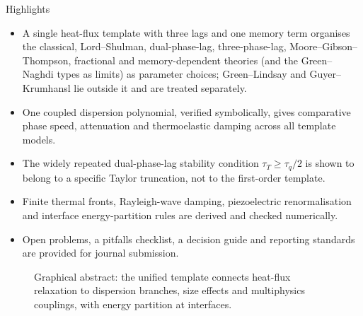 \begin{summarybox}{Highlights}
\begin{itemize}[nosep]
\item A single heat-flux template with three lags and one memory term organises the classical, Lord--Shulman, dual-phase-lag, three-phase-lag, Moore--Gibson--Thompson, fractional and memory-dependent theories (and the Green--Naghdi types as limits) as parameter choices; Green--Lindsay and Guyer--Krumhansl lie outside it and are treated separately.
\item One coupled dispersion polynomial, verified symbolically, gives comparative phase speed, attenuation and thermoelastic damping across all template models.
\item The widely repeated dual-phase-lag stability condition $\tau_T\ge\tau_q/2$ is shown to belong to a specific Taylor truncation, not to the first-order template.
\item Finite thermal fronts, Rayleigh-wave damping, piezoelectric renormalisation and interface energy-partition rules are derived and checked numerically.
\item Open problems, a pitfalls checklist, a decision guide and reporting standards are provided for journal submission.
\end{itemize}
\end{summarybox}

\begin{figure}[t!]
\centering
{}
\caption{Graphical abstract: the unified template connects heat-flux relaxation to dispersion branches, size effects and multiphysics couplings, with energy partition at interfaces.}\label{fig:graphical}
\end{figure}

